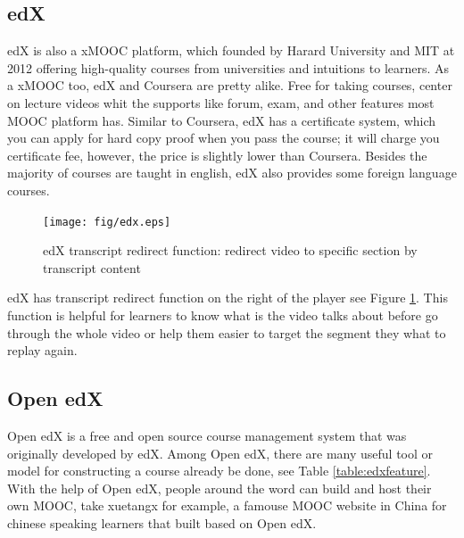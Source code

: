 \subsection{edX}
edX \cite{edx} is also a xMOOC platform, which founded by Harard University and MIT at 2012 offering high-quality courses from universities and intuitions to learners.
As a xMOOC too, edX and Coursera are pretty alike. Free for taking courses, center on lecture videos whit the supports like forum, exam, and other features most MOOC platform has.
Similar to Coursera, edX has a certificate system, which you can apply for hard copy proof when you pass the course; it will charge you certificate fee, however, the price is slightly lower than Coursera.
Besides the majority of courses are taught in english, edX also provides some foreign language courses.
\begin{figure}[H]
    \centering
    \texttt{[image: fig/edx.eps]}
    \caption{edX transcript redirect function: redirect video to specific section by transcript content}
    \label{fig:edx}
\end{figure}
edX has transcript redirect function on the right of the player see Figure \ref{fig:edx}.
This function is helpful for learners to know what is the video talks about before go through the whole video or help them easier to target the segment they what to replay again.

\subsection{Open edX}
Open edX is a free and open source course management system that was originally developed by edX.
Among Open edX, there are many useful tool or model for constructing a course already be done, see Table \ref{table:edxfeature}.
With the help of Open edX, people around the word can build and host their own MOOC, take xuetangx \cite{xuetangx} for example, a famouse MOOC website in China for chinese speaking learners that built based on Open edX.

